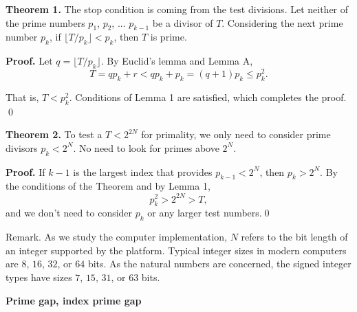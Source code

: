\smallvskip

{\bf Theorem 1.} The stop condition is coming from the test divisions.
Let neither of the prime numbers $p_1$, $p_2$, ... $p_{k-1}$ be a divisor of $T$.
Considering the next prime number $p_k$, if $\lfloor T/p_k \rfloor < p_k$, then $T$ is prime.

{\bf Proof.\/} Let $q = \lfloor T/p_k \rfloor$. By Euclid's lemma and Lemma A,
$$
T = q p_k + r < q p_k + p_k = (q+1) p_k \le p_k^2.
$$

That is, $T < p_k^2$. Conditions of Lemma 1 are satisfied, which completes the proof. \qed

\smallvskip

{\bf Theorem 2.} To test a $T<2^{2N}$ for primality, we only need to consider prime divisors $p_k<2^N$.
No need to look for primes above $2^N$.

{\bf Proof.\/} 
If $k-1$ is the largest index that provides $p_{k-1}<2^N$, then $p_k>2^N$. By the conditions of the Theorem
and by Lemma 1,
$$
p_k^2 > 2^{2N} > T,
$$
and we don't need to consider $p_k$ or any larger test numbers.\qed

Remark. As we study the computer implementation, $N$ refers to the bit length of an integer supported by the platform.
Typical integer sizes in modern computers are $8$, $16$, $32$, or $64$ bits. As the natural numbers are concerned,
the signed integer types have sizes $7$, $15$, $31$, or $63$ bits.

\vfil\break

{\bf Prime gap, index prime gap}
\bigvskip



\bye
